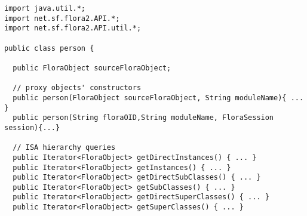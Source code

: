 \begin{verbatim}
import java.util.*;
import net.sf.flora2.API.*;
import net.sf.flora2.API.util.*;

public class person {

  public FloraObject sourceFloraObject;

  // proxy objects' constructors
  public person(FloraObject sourceFloraObject, String moduleName){ ... }
  public person(String floraOID,String moduleName, FloraSession session){...}

  // ISA hierarchy queries
  public Iterator<FloraObject> getDirectInstances() { ... }
  public Iterator<FloraObject> getInstances() { ... }
  public Iterator<FloraObject> getDirectSubClasses() { ... }
  public Iterator<FloraObject> getSubClasses() { ... }
  public Iterator<FloraObject> getDirectSuperClasses() { ... }
  public Iterator<FloraObject> getSuperClasses() { ... }


\end{verbatim}
